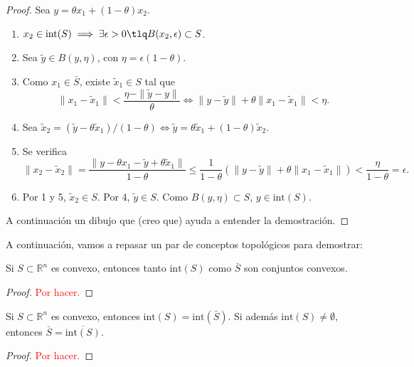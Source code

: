 \begin{proof}

Sea $y=\theta x_1+ (1-\theta)x_2$.

\begin{enumerate}
\item $x_2 \in \mbox{int}(S) \implies \exists \epsilon>0 \tlq B(x_2,\epsilon)\subset S$.
\item Sea $\tilde{y}\in B(y,\eta)$, con $\eta=\epsilon(1-\theta)$.
\item Como $x_1\in\bar{S}$, existe $\tilde{x}_1\in S$ tal que
\[
\|x_1-\tilde{x}_1\| < \frac{\eta-\|\tilde{y}-y\|}{\theta}
\Leftrightarrow \|y-\tilde{y}\| + \theta \|x_1 - \tilde{x}_1\| < \eta.
\]
\item Sea $\tilde{x}_2=(\tilde{y} - \theta \tilde{x}_1)/(1-\theta) \Leftrightarrow
\tilde{y}=\theta \tilde{x}_1 + (1-\theta) \tilde{x}_2$.
\item Se verifica
\[
\|x_2-\tilde{x}_2\| = \frac{\|y-\theta x_1 - \tilde{y}+\theta\tilde{x}_1\|}{1-\theta}\leq
\frac{1}{1-\theta}(\|y-\tilde{y}\| + \theta \|x_1 - \tilde{x}_1\|)<\frac{\eta}{1-\theta} = \epsilon.
\]
\item Por 1 y 5, $\tilde{x}_2\in S$. Por 4, $\tilde{y}\in S$. Como $B(y,\eta)\subset S$, $y\in \mbox{int}(S)$.


\end{enumerate}

A continuación un dibujo que (creo que) ayuda a entender la demostración.


\end{proof}



A continuación, vamos a repasar un par de conceptos topológicos para demostrar:

\begin{corol}
Si $S\subset\mathbb{R}^n$ es convexo, entonces tanto $\mbox{int}(S)$ como $\bar{S}$ son conjuntos convexos.
\end{corol}
\begin{proof}
\textcolor{red}{Por hacer.}
\end{proof}
\begin{corol}
Si $S\subset\mathbb{R}^n$ es convexo, entonces $\mbox{int}(S)=\mbox{int}(\bar{S})$.
Si además $\mbox{int}(S)\neq \emptyset$, entonces $\bar{S}=\overline{\mbox{int}(S)}$.
\end{corol}
\begin{proof}
\textcolor{red}{Por hacer.}
\end{proof}

